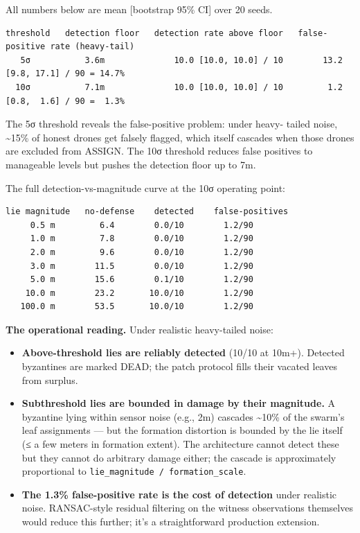 All numbers below are mean {[}bootstrap 95\% CI{]} over 20 seeds.

\begin{verbatim}
threshold   detection floor   detection rate above floor   false-positive rate (heavy-tail)
   5σ           3.6m              10.0 [10.0, 10.0] / 10        13.2 [9.8, 17.1] / 90 = 14.7%
  10σ           7.1m              10.0 [10.0, 10.0] / 10         1.2 [0.8,  1.6] / 90 =  1.3%
\end{verbatim}

The 5σ threshold reveals the false-positive problem: under heavy- tailed
noise, \textasciitilde15\% of honest drones get falsely flagged, which
itself cascades when those drones are excluded from ASSIGN. The 10σ
threshold reduces false positives to manageable levels but pushes the
detection floor up to 7m.

The full detection-vs-magnitude curve at the 10σ operating point:

\begin{verbatim}
lie magnitude   no-defense    detected    false-positives
     0.5 m         6.4        0.0/10        1.2/90
     1.0 m         7.8        0.0/10        1.2/90
     2.0 m         9.6        0.0/10        1.2/90
     3.0 m        11.5        0.0/10        1.2/90
     5.0 m        15.6        0.1/10        1.2/90
    10.0 m        23.2       10.0/10        1.2/90
   100.0 m        53.5       10.0/10        1.2/90
\end{verbatim}

\textbf{The operational reading.} Under realistic heavy-tailed noise:

\begin{itemize}
\tightlist
\item
  \textbf{Above-threshold lies are reliably detected} (10/10 at 10m+).
  Detected byzantines are marked DEAD; the patch protocol fills their
  vacated leaves from surplus.
\item
  \textbf{Subthreshold lies are bounded in damage by their magnitude.} A
  byzantine lying within sensor noise (e.g., 2m) cascades
  \textasciitilde10\% of the swarm's leaf assignments --- but the
  formation distortion is bounded by the lie itself (≤ a few meters in
  formation extent). The architecture cannot detect these but they
  cannot do arbitrary damage either; the cascade is approximately
  proportional to \texttt{lie\_magnitude\ /\ formation\_scale}.
\item
  \textbf{The 1.3\% false-positive rate is the cost of detection} under
  realistic noise. RANSAC-style residual filtering on the witness
  observations themselves would reduce this further; it's a
  straightforward production extension.
\end{itemize}

